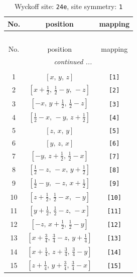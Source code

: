 \documentclass[fleqn,8pt]{jsarticle}
\begin{document}
\begin{longtable}{ccc}
\caption{Wyckoff site: {\tt 24e}, site symmetry: {\tt 1}}
 \\
 \hline \hline
No. & position & mapping \\ \hline \endfirsthead

\multicolumn{2}{l}{\tablename\ \thetable{}} \\
 \hline \hline
No. & position & mapping \\ \hline \endhead

 \hline \hline
\multicolumn{2}{r}{\footnotesize\it continued ...} \\ \endfoot

 \hline \hline
\multicolumn{2}{r}{} \\ \endlastfoot

1 & $\left[ x,\, y,\, z \right]$ & {\tt [1]} \\ \hline
2 & $\left[ x + \frac{1}{2},\, \frac{1}{2} - y,\, - z \right]$ & {\tt [2]} \\ \hline
3 & $\left[ - x,\, y + \frac{1}{2},\, \frac{1}{2} - z \right]$ & {\tt [3]} \\ \hline
4 & $\left[ \frac{1}{2} - x,\, - y,\, z + \frac{1}{2} \right]$ & {\tt [4]} \\ \hline
5 & $\left[ z,\, x,\, y \right]$ & {\tt [5]} \\ \hline
6 & $\left[ y,\, z,\, x \right]$ & {\tt [6]} \\ \hline
7 & $\left[ - y,\, z + \frac{1}{2},\, \frac{1}{2} - x \right]$ & {\tt [7]} \\ \hline
8 & $\left[ \frac{1}{2} - z,\, - x,\, y + \frac{1}{2} \right]$ & {\tt [8]} \\ \hline
9 & $\left[ \frac{1}{2} - y,\, - z,\, x + \frac{1}{2} \right]$ & {\tt [9]} \\ \hline
10 & $\left[ z + \frac{1}{2},\, \frac{1}{2} - x,\, - y \right]$ & {\tt [10]} \\ \hline
11 & $\left[ y + \frac{1}{2},\, \frac{1}{2} - z,\, - x \right]$ & {\tt [11]} \\ \hline
12 & $\left[ - z,\, x + \frac{1}{2},\, \frac{1}{2} - y \right]$ & {\tt [12]} \\ \hline
13 & $\left[ x + \frac{3}{4},\, \frac{3}{4} - z,\, y + \frac{1}{4} \right]$ & {\tt [13]} \\ \hline
14 & $\left[ x + \frac{1}{4},\, z + \frac{3}{4},\, \frac{3}{4} - y \right]$ & {\tt [14]} \\ \hline
15 & $\left[ z + \frac{1}{4},\, y + \frac{3}{4},\, \frac{3}{4} - x \right]$ & {\tt [15]} \\ \hline

\end{longtable}
\end{document}
